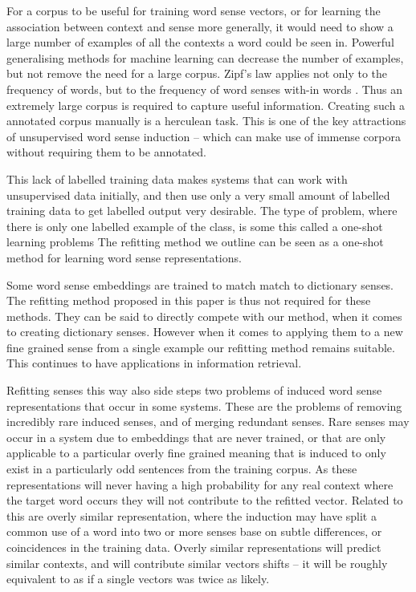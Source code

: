 For a corpus to be useful for training word sense vectors, or for learning the association between context and sense more generally, it would need to show a large number of examples of all the contexts a word could be seen in. Powerful generalising methods for machine learning can decrease the number of examples, but not remove the need for a large corpus.
Zipf's law \parencite{zipf1949human} applies not only to the frequency of words, but to the frequency of word senses with-in words \parencite{Kilgarriff2004}. Thus an extremely large corpus is required to capture useful information. Creating such a annotated corpus manually is a herculean task. This is one of the key attractions of unsupervised word sense induction -- which can make use of immense corpora without requiring them to be annotated.

This lack of labelled training data makes systems that can work with unsupervised data initially, and then use only a very small amount of labelled training data to get labelled output very desirable.
The type of problem, where there is only one labelled example of the class, is some this called a one-shot learning problems
The refitting method we outline can be seen as a one-shot method for learning word sense representations.



Some word sense embeddings are trained to match match to dictionary senses. The refitting method proposed in this paper is thus not required for these methods.
They can be said to directly compete with our method, when it comes to creating dictionary senses. However when it comes to applying them to a new fine grained sense from a single example our refitting method remains suitable. This continues to have applications in information retrieval.



Refitting senses this way also side steps two problems of induced word sense representations that occur in some systems. These are the problems of removing incredibly rare induced senses, and of merging redundant senses.
Rare senses may occur in a system due to embeddings that are never trained, or that are only applicable to a particular overly fine grained meaning that is induced to only exist in a particularly odd sentences from the training corpus. As these representations will never having a high probability for any real context where the target word occurs they will not contribute to the refitted vector. Related to this are overly similar representation, where the induction may have split a common use of a word into two or more senses base on subtle differences, or coincidences in the training data. Overly similar representations will  predict similar contexts, and will contribute similar vectors shifts -- it will be roughly equivalent to as if a single vectors was twice as likely.
